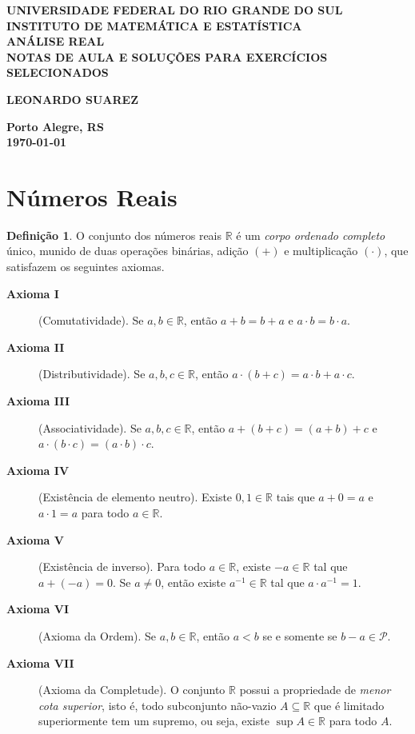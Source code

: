 \documentclass[12pt]{article}
\theoremstyle{plain}
\theoremstyle{definition}
\newtheorem{defn}[thm]{Definição}
\theoremstyle{remark}
\begin{document}
\begin{center}
    \textbf{\large UNIVERSIDADE FEDERAL DO RIO GRANDE DO SUL} \\
    \textbf{\large INSTITUTO DE MATEMÁTICA E ESTATÍSTICA} \\
    \vspace{3cm}
    \textbf{\Large ANÁLISE REAL} \\
    \vspace{1cm}
    \textbf{\large NOTAS DE AULA E SOLUÇÕES PARA EXERCÍCIOS SELECIONADOS} \\
    \vspace{3cm}

    \textbf{LEONARDO SUAREZ}

    \vfill
    \textbf{\large Porto Alegre, RS} \\
    \textbf{\large \today}
\end{center}

\newpage
\tableofcontents
\newpage

\section{Números Reais}

\begin{defn}
    O conjunto dos números reais \(\mathbb{R}\) é um \emph{corpo ordenado completo} único, munido de duas operações binárias, adição \(\left(+\right)\) e multiplicação \(\left(\cdot\right)\), que satisfazem os seguintes axiomas.
    \begin{description}
        \item[\textbf{Axioma I}] (Comutatividade). Se \(a, b \in \mathbb{R}\), então \(a + b = b + a\) e \(a \cdot b = b \cdot a\).
        \item[\textbf{Axioma II}] (Distributividade). Se \(a, b, c \in \mathbb{R}\), então \(a \cdot (b + c) = a \cdot b + a \cdot c\).
        \item[\textbf{Axioma III}] (Associatividade). Se \(a, b, c \in \mathbb{R}\), então \(a + (b + c) = (a + b) + c\) e \(a \cdot (b \cdot c) = (a \cdot b) \cdot c\).
        \item[\textbf{Axioma IV}] (Existência de elemento neutro). Existe \(0, 1 \in \mathbb{R}\) tais que \(a + 0 = a\) e \(a \cdot 1 = a\) para todo \(a \in \mathbb{R}\).
        \item[\textbf{Axioma V}] (Existência de inverso). Para todo \(a \in \mathbb{R}\), existe \(-a \in \mathbb{R}\) tal que \(a + (-a) = 0\). Se \(a \neq 0\), então existe \(a^{-1} \in \mathbb{R}\) tal que \(a \cdot a^{-1} = 1\).
        \item[\textbf{Axioma VI}] (Axioma da Ordem). Se \(a, b \in \mathbb{R}\), então \(a < b\) se e somente se \(b - a \in \mathcal{P}\).
        \item[\textbf{Axioma VII}] (Axioma da Completude). O conjunto \(\mathbb{R}\) possui a propriedade de \emph{menor cota superior}, isto é, todo subconjunto não-vazio \(A \subseteq \mathbb{R}\) que é limitado superiormente tem um supremo, ou seja, existe \(\sup A \in \mathbb{R}\) para todo \(A\).
    \end{description}
\end{defn}
\end{document}
